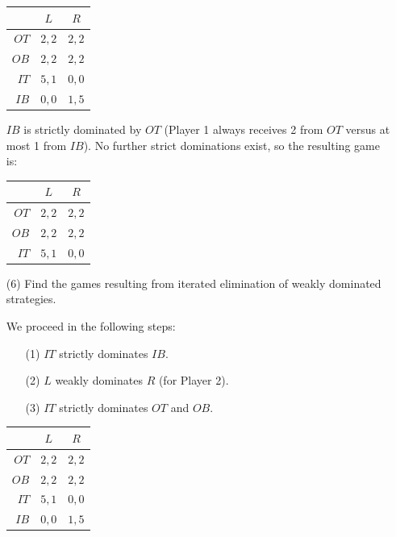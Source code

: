 \documentclass[11pt,english]{article}
\begin{document}
\begin{enumerate}
\begin{solution}
\begin{center}
\begin{tabular}{r|cc}
\toprule
              & $L$     & $R$     \\
\midrule
$OT$          & $2,2$   & $2,2$   \\
$OB$          & $2,2$   & $2,2$   \\
$IT$          & $5,1$   & $0,0$   \\
\sout{$IB$}   & \sout{$0,0$} & \sout{$1,5$} \\
\bottomrule
\end{tabular}
\end{center}
 
$IB$ is strictly dominated by $OT$ (Player 1 always receives 2 from $OT$
versus at most 1 from $IB$). No further strict dominations exist, so the
resulting game is:
 
\begin{center}
\begin{tabular}{r|cc}
\toprule
    & $L$   & $R$   \\
\midrule
$OT$ & $2,2$ & $2,2$ \\
$OB$ & $2,2$ & $2,2$ \\
$IT$ & $5,1$ & $0,0$ \\
\bottomrule
\end{tabular}
\end{center}
\end{solution}
  \item[(6)] Find the games resulting from iterated elimination of weakly
    dominated strategies.
\begin{solution}
We proceed in the following steps:
 
\begin{enumerate}
  \item[(1)] $IT$ strictly dominates $IB$.
  \item[(2)] $L$ weakly dominates $R$ (for Player 2).
  \item[(3)] $IT$ strictly dominates $OT$ and $OB$.
\end{enumerate}
 
\begin{center}
\begin{tabular}{r|cc}
\toprule
             & $L$               & \sout{$R$}        \\
\midrule
\sout{$OT$}  & \sout{$2,2$}      & \sout{$2,2$}      \\
\sout{$OB$}  & \sout{$2,2$}      & \sout{$2,2$}      \\
$IT$         & $5,1$             & \sout{$0,0$}      \\
\sout{$IB$}  & \sout{$0,0$}      & \sout{$1,5$}      \\
\bottomrule
\end{tabular}
\end{center}
 

\end{solution}
\end{enumerate}
\end{document}
